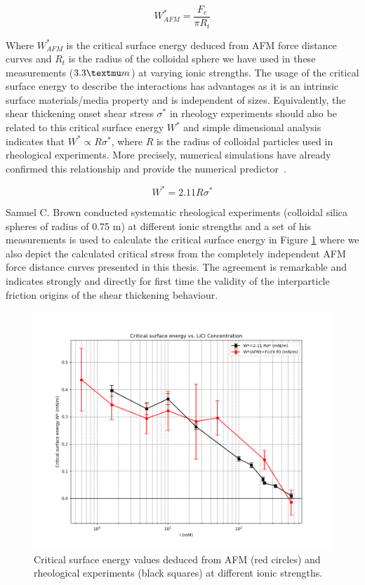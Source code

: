 \[ W^*_{AFM} = \frac{F_c}{\pi R_t} \]

Where $W^*_{AFM}$ is the critical surface energy deduced from AFM force distance curves and $R_t$ is the radius of the colloidal sphere we have used in these measurements ($3.3 \textmu m$) at varying ionic strengths. The usage of the critical surface energy to describe the interactions has advantages as it is an intrinsic surface materials/media property and is independent of sizes. Equivalently, the shear thickening onset shear stress $\sigma^*$ in rheology experiments should also be related to this critical surface energy $W^*$ and simple dimensional analysis indicates that $W^* \propto R\sigma^*$, where $R$ is the radius of colloidal particles used in rheological experiments. More precisely, numerical simulations have already confirmed this relationship and provide the numerical predictor~\cite{reference4}.

\[ W^* = 2.11 R\sigma^* \]

Samuel C. Brown conducted systematic rheological experiments (colloidal silica spheres of radius of 0.75 \textmu m) at different ionic strengths and a set of his measurements is used to calculate the critical surface energy in Figure \ref{fig:critical_surface_energy} where we also depict the calculated critical stress from the completely independent AFM force distance curves presented in this thesis. The agreement is remarkable and indicates strongly and directly for first time the validity of the interparticle friction origins of the shear thickening behaviour.

\begin{figure}[h!]
\centering
\includegraphics[width=\textwidth]{chapter8/Rheology/Comparison graph.png}
\caption{Critical surface energy values deduced from AFM (red circles) and rheological experiments (black squares) at different ionic strengths.}
\label{fig:critical_surface_energy}
\end{figure}

